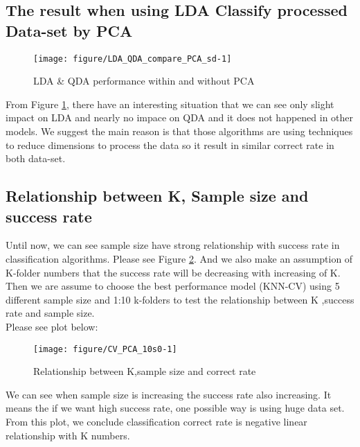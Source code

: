\documentclass{article}\usepackage[]{graphicx}\usepackage[]{color}
\newenvironment{knitrout}{}{} %
\begin{document}
	\subsection{The result when using LDA Classify processed Data-set by PCA}
\begin{knitrout}
\color{fgcolor}

{\begin{figure}[h!]
	\caption{LDA \& QDA performance within and without PCA}
	\centering \texttt{[image: figure/LDA\_QDA\_compare\_PCA\_sd-1]} 
	\label{fig3}
\end{figure}
}



\end{knitrout}
	\noindent	From Figure \ref{fig3}, there have an interesting situation that we can see only slight impact on LDA and nearly no impace on QDA  and it does not happened in other models.
	\noindent	We suggest the main reason is that those algorithms are using techniques to reduce dimensions to process the data so it result in similar correct rate in both data-set.\\
	\subsection{Relationship between K, Sample size and success rate}
	\noindent	Until now, we can see sample size have strong relationship with success rate in classification algorithms. Please see Figure \ref{fig4}.
	And we also make an assumption of K-folder numbers that the success rate will be decreasing with increasing of K.\\
	\noindent	Then we are assume to choose the best performance model (KNN-CV) using 5 different sample size and 1:10 k-folders to test the relationship between K ,success rate and sample size.\\
	\noindnet	Please see plot below:\\
\begin{knitrout}
\color{fgcolor}
{\begin{figure}[h!]
	\caption{Relationship between K,sample size and correct rate}
		\centering \texttt{[image: figure/CV\_PCA\_10s0-1]} 
		\label{fig4}
\end{figure}
}
\end{knitrout}
	\noindent	We can see when sample size is increasing the success rate also increasing. It means the if we want high success rate, one possible way is using huge data set.
	\noindent	From this plot, we conclude classification correct rate is negative linear relationship with K numbers.\\ 
\end{document}
